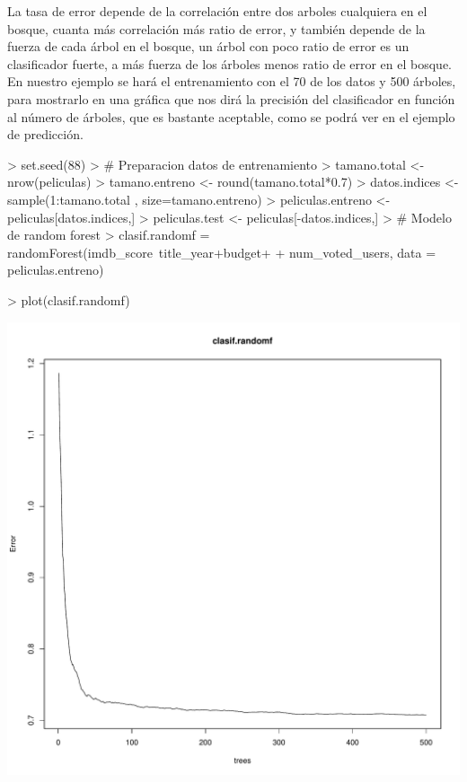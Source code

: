 \documentclass[a4paper]{article}
\begin{document}
La tasa de error depende de la correlación entre dos arboles cualquiera en el bosque, cuanta más correlación más ratio de error, y también depende de la fuerza de cada árbol en el bosque, un árbol con poco ratio de error es un clasificador fuerte, a más fuerza de los árboles menos ratio de error en el bosque.
En nuestro ejemplo se hará el entrenamiento con el 70 de los datos y 500 árboles, para mostrarlo en una gráfica que nos dirá la precisión del clasificador en función al número de árboles, que es bastante aceptable, como se podrá ver en el ejemplo de predicción.
\begin{Schunk}
\begin{Sinput}
> set.seed(88)
> # Preparacion datos de entrenamiento
> tamano.total <- nrow(peliculas)
> tamano.entreno <- round(tamano.total*0.7)
> datos.indices <- sample(1:tamano.total , size=tamano.entreno)
> peliculas.entreno <- peliculas[datos.indices,]
> peliculas.test <- peliculas[-datos.indices,]
> # Modelo de random forest
> clasif.randomf = randomForest(imdb_score~title_year+budget+
+                  num_voted_users, data = peliculas.entreno)
\end{Sinput}
\end{Schunk}

\begin{Schunk}
\begin{Sinput}
> plot(clasif.randomf)
\end{Sinput}
\end{Schunk}
\includegraphics{practica-3-randomf}
\end{document}

